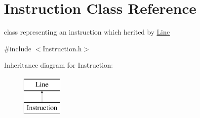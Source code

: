 \hypertarget{class_instruction}{}\section{Instruction Class Reference}
\label{class_instruction}


class representing an instruction which herited by \hyperlink{class_line}{Line}  




{\ttfamily \#include $<$Instruction.\+h$>$}

Inheritance diagram for Instruction\+:\begin{figure}[H]
\begin{center}
\leavevmode
\includegraphics[height=2.000000cm]{class_instruction}
\end{center}
\end{figure}

